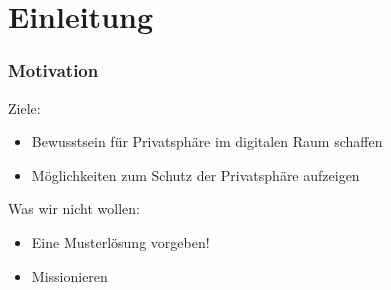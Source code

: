 \section{Einleitung}

\begin{frame}
  \frametitle{Motivation}

  Ziele:
  \begin{itemize}
   \item Bewusstsein für Privatsphäre im digitalen Raum schaffen
   \item Möglichkeiten zum Schutz der Privatsphäre aufzeigen
  \end{itemize}

  \vspace{2ex}

  Was wir nicht wollen:
  \begin{itemize}
    \item Eine Musterlösung vorgeben!
    \item Missionieren
  \end{itemize}
\end{frame}

